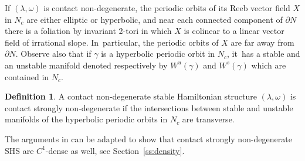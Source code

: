 \documentclass[11pt]{article}
\theoremstyle{definition}
\newtheorem{defi}[theorem]{Definition}
\begin{document}
If $(\lambda,\omega)$ is contact non-degenerate, the periodic orbits of its Reeb vector field $X$ in $N_c$ are either elliptic or hyperbolic, and near each connected component of $\partial N$ there is a foliation by invariant 2-tori in which $X$ is colinear to a linear vector field of irrational slope. In~particular, the periodic orbits of $X$ are far away from $\partial N$. Observe also that if $\gamma$ is a hyperbolic periodic orbit in $N_c$, it~has a stable and an unstable manifold denoted respectively by $W^u(\gamma)$ and $W^s(\gamma)$ which are contained in $N_c$.

\begin{defi}
A contact non-degenerate stable Hamiltonian structure $(\lambda,\omega)$ is contact strongly non-degenerate if the intersections between stable and unstable manifolds of the hyperbolic periodic orbits in $N_c$ are transverse.
\end{defi}

The arguments in \cite{CV1} can be adapted to show that contact strongly non-degenerate SHS are $C^1$-dense as well, see Section~\ref{ss:density}.
\end{document}
